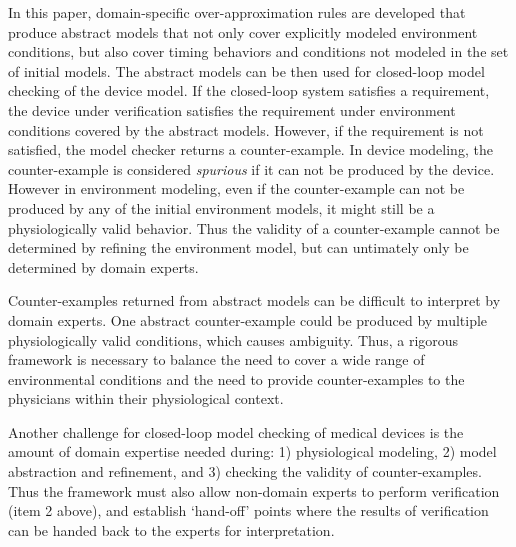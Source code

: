 In this paper, domain-specific over-approximation rules are developed that produce abstract models that not only cover explicitly modeled environment conditions, but also cover timing behaviors and conditions not modeled in the set of initial models. 
The abstract models can be then used for closed-loop model checking of the device model. 
If the closed-loop system satisfies a requirement, the device under verification satisfies the requirement under environment conditions covered by the abstract models. 
However, if the requirement is not satisfied, the model checker returns a counter-example. 
In device modeling, the counter-example is considered \emph{spurious} if it can not be produced by the device.
However in environment modeling, even if the counter-example can not be produced by any of the initial environment models, it might still be a physiologically valid behavior.
Thus the validity of a counter-example cannot be determined by refining the environment model, but can untimately only be determined by domain experts. 

Counter-examples returned from abstract models can be difficult to interpret by domain experts.
One abstract counter-example could be produced by multiple physiologically valid conditions, which causes ambiguity.
Thus, a rigorous framework is necessary to balance the need to cover a wide range of environmental conditions and the need to provide counter-examples to the physicians within their physiological context.

Another challenge for closed-loop model checking of medical devices is the amount of domain expertise needed during: 1) physiological modeling, 2) model abstraction and refinement, and 3) checking the validity of counter-examples.
Thus the framework must also allow non-domain experts to perform verification (item 2 above),
and establish `hand-off' points where the results of verification can be handed back 
to the experts for interpretation.

